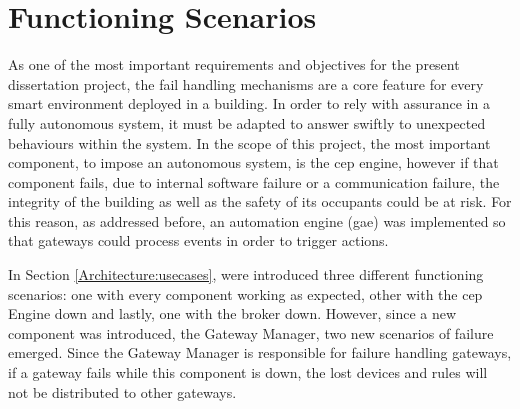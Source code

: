 \section{Functioning Scenarios}
\label{implementation:scenarios}

As one of the most important requirements and objectives for the present dissertation project, the fail handling mechanisms are a core feature for every smart environment deployed in a building. In order to rely with assurance in a fully autonomous system, it must be adapted to answer swiftly to unexpected behaviours within the system. In the scope of this project, the most important component, to impose an autonomous system, is the \ac{cep} engine, however if that component fails, due to internal software failure or a communication failure, the integrity of the building as well as the safety of its occupants could be at risk. For this reason, as addressed before, an automation engine (\ac{gae}) was implemented so that gateways could process events in order to trigger actions.

In Section \ref{Architecture:usecases}, were introduced three different functioning scenarios: one with every component working as expected, other with the \ac{cep} Engine down and lastly, one with the broker down. However, since a new component was introduced, the Gateway Manager, two new scenarios of failure emerged. Since the Gateway Manager is responsible for failure handling gateways, if a gateway fails while this component is down, the lost devices and rules will not be distributed to other gateways.

